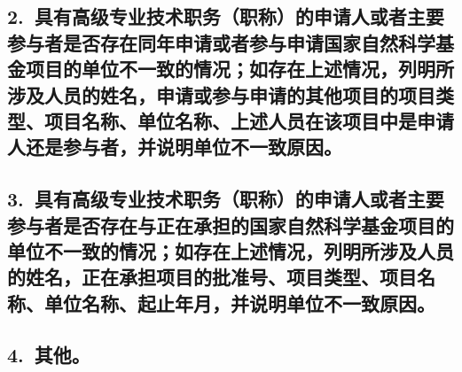 \documentclass[12pt,UTF8,AutoFakeBold=2.5,a4paper]{ctexart} %
\begin{document}


\subsection{\hspace{1.45em}  2.~具有高级专业技术职务（职称）的申请人或者主要参与者是否存在同年申请或者参与申请国家自然科学基金项目的单位不一致的情况；如存在上述情况，列明所涉及人员的姓名，申请或参与申请的其他项目的项目类型、项目名称、单位名称、上述人员在该项目中是申请人还是参与者，并说明单位不一致原因。}



\subsection{\hspace{1.45em}  3.~具有高级专业技术职务（职称）的申请人或者主要参与者是否存在与正在承担的国家自然科学基金项目的单位不一致的情况；如存在上述情况，列明所涉及人员的姓名，正在承担项目的批准号、项目类型、项目名称、单位名称、起止年月，并说明单位不一致原因。\hspace{-16pt}}



\subsection{\hspace{1.45em}  4.~其他。}



\clearpage
\end{document}
